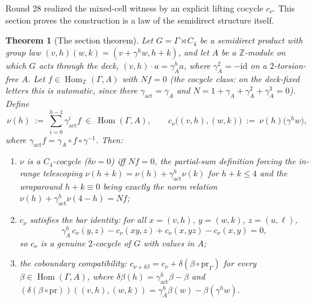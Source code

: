 \documentclass[11pt]{article}
\newcommand{\Z}{\mathbb Z}
\newcommand{\Hom}{\operatorname{Hom}}
\newtheorem{theorem}{Theorem}[section]
\begin{document}
Round 28 realized the mixed-cell witness by an explicit lifting
cocycle $c_\nu$. This section proves the construction is a law of the
semidirect structure itself.

\begin{theorem}[The section theorem]\label{thm:section}
Let $G=\Gamma\rtimes C_4$ be a semidirect product with group law
$(v,h)(w,k)=(v+\gamma^h w,h+k)$, and let $A$ be a $\Z$-module on which
$G$ acts through the deck, $(v,h)\cdot a=\gamma_A^h a$, where
$\gamma_A^2=-\mathrm{id}$ on a $2$-torsion-free $A$. Let
$f\in\Hom_\Z(\Gamma,A)$ with $Nf=0$ (the cocycle class: on the
deck-fixed letters this is automatic, since there
$\gamma_{\mathrm{act}}=\gamma_A$ and
$N=1+\gamma_A+\gamma_A^2+\gamma_A^3=0$). Define
\[
\nu(h)\ :=\ \sum_{i=0}^{h-1}\gamma_{\mathrm{act}}^i f\ \in\
\Hom(\Gamma,A),\qquad
c_\nu\bigl((v,h),(w,k)\bigr)\ :=\ \nu(h)\bigl(\gamma^h w\bigr),
\]
where $\gamma_{\mathrm{act}}f=\gamma_A\circ f\circ\gamma^{-1}$. Then:
\begin{enumerate}
\item $\nu$ is a $C_4$-cocycle ($\delta\nu=0$) \emph{iff} $Nf=0$, the
partial-sum definition forcing the in-range telescoping
$\nu(h+k)=\nu(h)+\gamma_{\mathrm{act}}^h\nu(k)$ for $h+k\le4$ and the
wraparound $h+k\equiv0$ being exactly the norm relation
$\nu(h)+\gamma_{\mathrm{act}}^h\nu(4-h)=Nf$;
\item $c_\nu$ satisfies the bar identity: for all
$x=(v,h)$, $y=(w,k)$, $z=(u,\ell)$,
\[
\gamma_A^h\,c_\nu(y,z)-c_\nu(xy,z)+c_\nu(x,yz)-c_\nu(x,y)=0,
\]
so $c_\nu$ is a genuine $2$-cocycle of $G$ with values in $A$;
\item the coboundary compatibility: $c_{\nu+\delta\beta}
=c_\nu+\delta(\beta\circ\mathrm{pr}_\Gamma)$ for every
$\beta\in\Hom(\Gamma,A)$, where
$\delta\beta(h)=\gamma_{\mathrm{act}}^h\beta-\beta$ and
$(\delta(\beta\circ\mathrm{pr}))((v,h),(w,k))
=\gamma_A^h\beta(w)-\beta(\gamma^h w)$.
\end{enumerate}
\end{theorem}
\end{document}
